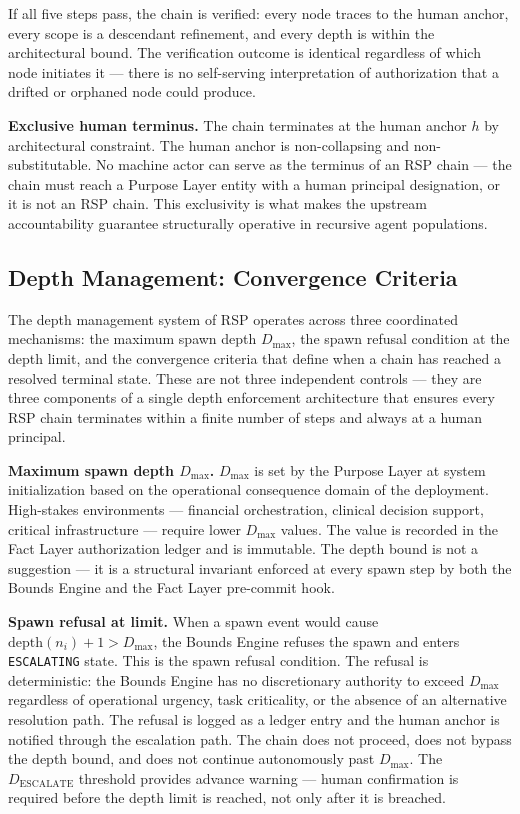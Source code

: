 If all five steps pass, the chain is verified: every node traces to the human anchor, every scope is a descendant refinement, and every depth is within the architectural bound. The verification outcome is identical regardless of which node initiates it — there is no self-serving interpretation of authorization that a drifted or orphaned node could produce.

\medskip
\noindent\textbf{Exclusive human terminus.} The chain terminates at the human anchor $h$ by architectural constraint. The human anchor is non-collapsing and non-substitutable. No machine actor can serve as the terminus of an RSP chain — the chain must reach a Purpose Layer entity with a human principal designation, or it is not an RSP chain. This exclusivity is what makes the \bxthree{} upstream accountability guarantee structurally operative in recursive agent populations.

\subsection{Depth Management: Convergence Criteria}
\label{sec:rs-depth-management}

The depth management system of RSP operates across three coordinated mechanisms: the maximum spawn depth $D_{\max}$, the spawn refusal condition at the depth limit, and the convergence criteria that define when a chain has reached a resolved terminal state. These are not three independent controls — they are three components of a single depth enforcement architecture that ensures every RSP chain terminates within a finite number of steps and always at a human principal.

\medskip
\noindent\textbf{Maximum spawn depth $D_{\max}$.} $D_{\max}$ is set by the Purpose Layer at system initialization based on the operational consequence domain of the deployment. High-stakes environments — financial orchestration, clinical decision support, critical infrastructure — require lower $D_{\max}$ values. The value is recorded in the Fact Layer authorization ledger and is immutable. The depth bound is not a suggestion — it is a structural invariant enforced at every spawn step by both the Bounds Engine and the Fact Layer pre-commit hook.

\medskip
\noindent\textbf{Spawn refusal at limit.} When a spawn event would cause $\text{depth}(n_i) + 1 > D_{\max}$, the Bounds Engine refuses the spawn and enters \texttt{ESCALATING} state. This is the spawn refusal condition. The refusal is deterministic: the Bounds Engine has no discretionary authority to exceed $D_{\max}$ regardless of operational urgency, task criticality, or the absence of an alternative resolution path. The refusal is logged as a ledger entry and the human anchor is notified through the escalation path. The chain does not proceed, does not bypass the depth bound, and does not continue autonomously past $D_{\max}$. The $D_{\text{ESCALATE}}$ threshold provides advance warning — human confirmation is required before the depth limit is reached, not only after it is breached.

